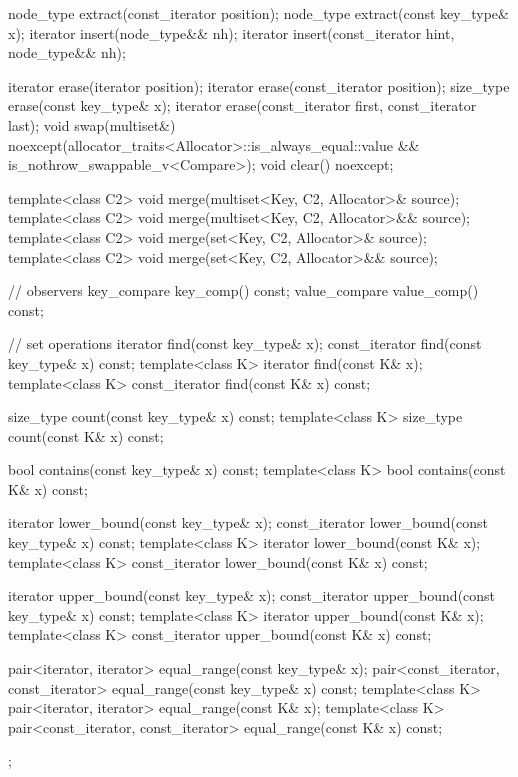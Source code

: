 \begin{codeblock}
{{    node_type extract(const_iterator position);
    node_type extract(const key_type& x);
    iterator insert(node_type&& nh);
    iterator insert(const_iterator hint, node_type&& nh);

    iterator  erase(iterator position);
    iterator  erase(const_iterator position);
    size_type erase(const key_type& x);
    iterator  erase(const_iterator first, const_iterator last);
    void      swap(multiset&)
      noexcept(allocator_traits<Allocator>::is_always_equal::value &&
               is_nothrow_swappable_v<Compare>);
    void      clear() noexcept;

    template<class C2>
      void merge(multiset<Key, C2, Allocator>& source);
    template<class C2>
      void merge(multiset<Key, C2, Allocator>&& source);
    template<class C2>
      void merge(set<Key, C2, Allocator>& source);
    template<class C2>
      void merge(set<Key, C2, Allocator>&& source);

    // observers
    key_compare key_comp() const;
    value_compare value_comp() const;

    // set operations
    iterator       find(const key_type& x);
    const_iterator find(const key_type& x) const;
    template<class K> iterator       find(const K& x);
    template<class K> const_iterator find(const K& x) const;

    size_type      count(const key_type& x) const;
    template<class K> size_type count(const K& x) const;

    bool           contains(const key_type& x) const;
    template<class K> bool contains(const K& x) const;

    iterator       lower_bound(const key_type& x);
    const_iterator lower_bound(const key_type& x) const;
    template<class K> iterator       lower_bound(const K& x);
    template<class K> const_iterator lower_bound(const K& x) const;

    iterator       upper_bound(const key_type& x);
    const_iterator upper_bound(const key_type& x) const;
    template<class K> iterator       upper_bound(const K& x);
    template<class K> const_iterator upper_bound(const K& x) const;

    pair<iterator, iterator>               equal_range(const key_type& x);
    pair<const_iterator, const_iterator>   equal_range(const key_type& x) const;
    template<class K>
      pair<iterator, iterator>             equal_range(const K& x);
    template<class K>
      pair<const_iterator, const_iterator> equal_range(const K& x) const;
  };

}
\end{codeblock}
